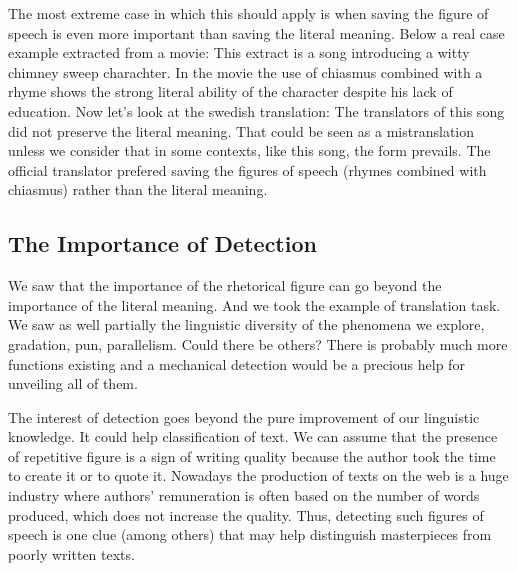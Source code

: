 The most extreme case in which this should apply is when saving the figure of speech is even more important than saving the literal meaning. Below a real case example extracted from a movie:
%
This extract is a song introducing a witty chimney sweep charachter. In the movie the use of chiasmus combined with a rhyme shows the strong literal ability of the character despite his lack of education. %
Now let's look at the swedish translation:%
%
The translators of this song did not preserve the literal meaning. That could be seen as a mistranslation unless we consider that in some contexts, like this song, the form prevails. The official translator prefered saving the figures of speech (rhymes combined with chiasmus) rather than the literal meaning.%

\subsection{The Importance of Detection}
We saw that the importance of the rhetorical figure can go beyond the importance of the literal meaning. And we took the example of translation task. We saw as well partially the linguistic diversity of the phenomena we explore, gradation, pun, parallelism. Could there be others? There is probably much more functions existing and a mechanical detection would be a precious help for unveiling all of them. %

The interest of detection goes beyond the pure improvement of our linguistic knowledge. It could help classification of text. We can assume that the presence of repetitive figure is a sign of writing quality because the author took the time to create it or to quote it. Nowadays the production of texts on the web is a huge industry where authors' remuneration is often based on the number of words produced, which does not increase the quality. Thus, detecting such figures of speech is one clue (among others) that may help distinguish masterpieces from poorly written texts.

